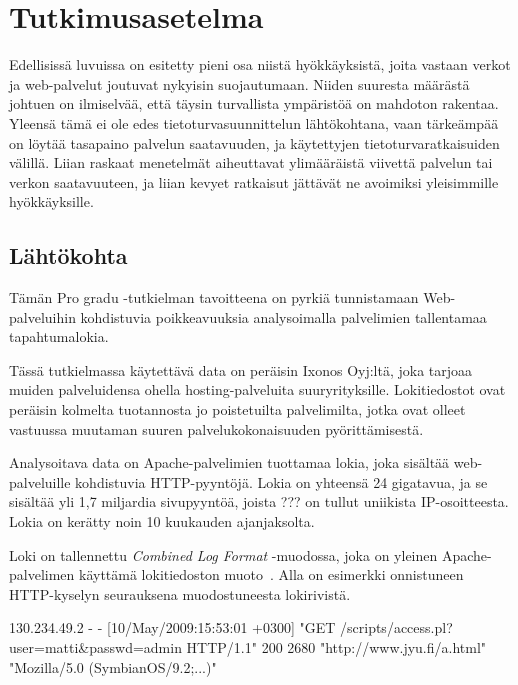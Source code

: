 
\chapter{Tutkimusasetelma}

Edellisissä luvuissa on esitetty pieni osa niistä hyökkäyksistä, joita vastaan verkot ja web-palvelut joutuvat nykyisin suojautumaan. Niiden suuresta määrästä johtuen on ilmiselvää, että täysin 
turvallista ympäristöä on mahdoton rakentaa. Yleensä tämä ei ole edes tietoturvasuunnittelun lähtökohtana, vaan tärkeämpää on löytää tasapaino palvelun saatavuuden, ja käytettyjen tietoturvaratkaisuiden 
välillä. Liian raskaat menetelmät aiheuttavat ylimääräistä viivettä palvelun tai verkon saatavuuteen, ja liian kevyet ratkaisut jättävät ne avoimiksi yleisimmille hyökkäyksille. 

\section{Lähtökohta}
\label{sec:lahtokohta}

Tämän Pro gradu -tutkielman tavoitteena on pyrkiä tunnistamaan Web-palveluihin kohdistuvia poikkeavuuksia analysoimalla palvelimien tallentamaa tapahtumalokia.

Tässä tutkielmassa käytettävä data on peräisin Ixonos Oyj:ltä, joka tarjoaa muiden palveluidensa ohella hosting-palveluita suuryrityksille. Lokitiedostot ovat peräisin kolmelta tuotannosta jo poistetuilta palvelimilta, jotka ovat olleet vastuussa muutaman suuren palvelukokonaisuuden pyörittämisestä.

Analysoitava data on Apache-palvelimien tuottamaa lokia, joka sisältää
web-palveluille kohdistuvia HTTP-pyyntöjä. Lokia on yhteensä 24
gigatavua, ja se sisältää yli 1,7 miljardia sivupyyntöä, joista ??? on
tullut uniikista IP-osoitteesta. Lokia on kerätty noin 10 kuukauden
ajanjaksolta. 


Loki on tallennettu \textit{Combined Log Format} -muodossa,
joka on yleinen Apache-palvelimen käyttämä lokitiedoston
muoto~\cite{combined}. Alla on esimerkki onnistuneen HTTP-kyselyn seurauksena muodostuneesta lokirivistä.

\begin{framed}
\begin{verbatim*}
130.234.49.2 - - [10/May/2009:15:53:01 +0300]
"GET /scripts/access.pl?user=matti&passwd=admin HTTP/1.1"
200 2680 "http://www.jyu.fi/a.html"
"Mozilla/5.0 (SymbianOS/9.2;...)"
\end{verbatim*}
\end{framed}

